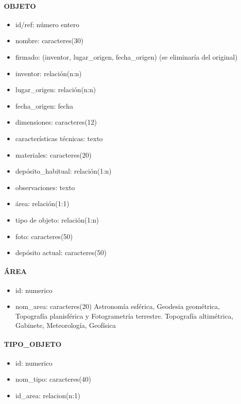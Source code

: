 \paragraph{OBJETO}
\begin{itemize}
\item id/ref: número entero
\item nombre: caracteres(30)
\item firmado: (inventor, lugar\_origen, fecha\_origen) (se eliminaría del original)
\item inventor: relación(n:n)
\item lugar\_origen: relación(n:n)
\item fecha\_origen: fecha
\item dimensiones: caracteres(12)
\item características técnicas: texto
\item materiales: caracteres(20)
\item depósito\_habitual: relación(1:n)
\item observaciones: texto
\item área: relación(1:1)
\item tipo de objeto: relación(1:n)
\item foto: caracteres(50)
\item depósito actual: caracteres(50)
\end{itemize}

\paragraph{ÁREA}
\begin{itemize}
\item id: numerico
\item nom\_area: caracteres(20)
{Astronomía esférica, Geodesia geométrica, Topografía planisférica y Fotogrametría terrestre.
Topografía altimétrica, Gabinete, Meteorología, Geofísica}
\end{itemize}

\paragraph{TIPO\_OBJETO}
\begin{itemize}
\item id: numerico
\item nom\_tipo: caracteres(40)
\item id\_area: relacion(n:1)
\end{itemize}

